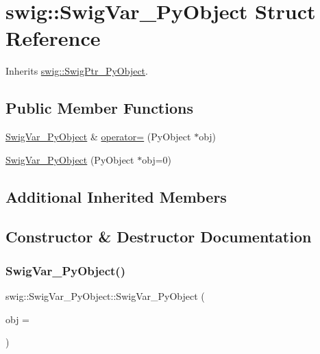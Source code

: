 \hypertarget{structswig_1_1_swig_var___py_object}{}\section{swig\+:\+:Swig\+Var\+\_\+\+Py\+Object Struct Reference}
\label{structswig_1_1_swig_var___py_object}


Inherits \hyperlink{classswig_1_1_swig_ptr___py_object}{swig\+::\+Swig\+Ptr\+\_\+\+Py\+Object}.

\subsection*{Public Member Functions}
\begin{DoxyCompactItemize}
\item 
\hyperlink{structswig_1_1_swig_var___py_object}{Swig\+Var\+\_\+\+Py\+Object} \& \hyperlink{structswig_1_1_swig_var___py_object_a7e6053b64cf6e787b99a67b09cdc6d89}{operator=} (Py\+Object $\ast$obj)
\item 
\hyperlink{structswig_1_1_swig_var___py_object_a2b61f843215bceaff8ec2ea6e92d46c2}{Swig\+Var\+\_\+\+Py\+Object} (Py\+Object $\ast$obj=0)
\end{DoxyCompactItemize}
\subsection*{Additional Inherited Members}


\subsection{Constructor \& Destructor Documentation}
\mbox{\label{structswig_1_1_swig_var___py_object_a2b61f843215bceaff8ec2ea6e92d46c2}} 
\subsubsection{\texorpdfstring{Swig\+Var\+\_\+\+Py\+Object()}{SwigVar\_PyObject()}}
{\footnotesize\ttfamily swig\+::\+Swig\+Var\+\_\+\+Py\+Object\+::\+Swig\+Var\+\_\+\+Py\+Object (\begin{DoxyParamCaption}\item[{Py\+Object $\ast$}]{obj = {} }\end{DoxyParamCaption})\hspace{0.3cm}{\ttfamily [inline]}}



